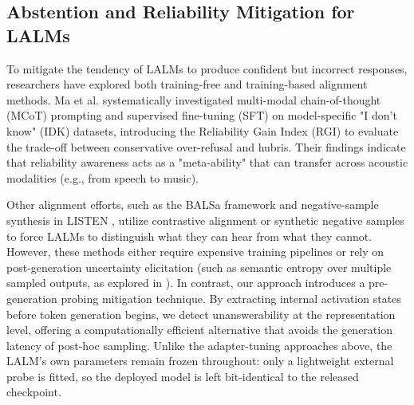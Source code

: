 \subsection{Abstention and Reliability Mitigation for LALMs}
To mitigate the tendency of LALMs to produce confident but incorrect responses, researchers have explored both training-free and training-based alignment methods. Ma et al. \cite{ma2025reliable} systematically investigated multi-modal chain-of-thought (MCoT) prompting and supervised fine-tuning (SFT) on model-specific "I don't know" (IDK) datasets, introducing the Reliability Gain Index (RGI) to evaluate the trade-off between conservative over-refusal and hubris. Their findings indicate that reliability awareness acts as a "meta-ability" that can transfer across acoustic modalities (e.g., from speech to music). 

Other alignment efforts, such as the BALSa framework \cite{kuan2025balsa} and negative-sample synthesis in LISTEN \cite{kuan2025listen}, utilize contrastive alignment or synthetic negative samples to force LALMs to distinguish what they can hear from what they cannot. However, these methods either require expensive training pipelines or rely on post-generation uncertainty elicitation (such as semantic entropy over multiple sampled outputs, as explored in \cite{kuan2026uncertainty}). In contrast, our approach introduces a pre-generation probing mitigation technique. By extracting internal activation states before token generation begins, we detect unanswerability at the representation level, offering a computationally efficient alternative that avoids the generation latency of post-hoc sampling. Unlike the adapter-tuning approaches above, the LALM's own parameters remain frozen throughout: only a lightweight external probe is fitted, so the deployed model is left bit-identical to the released checkpoint.
